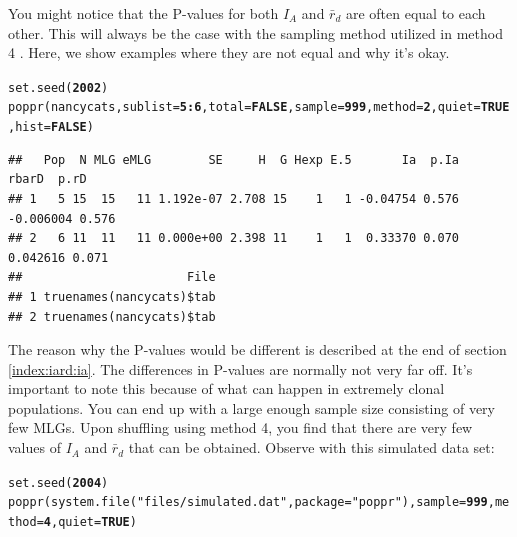 \documentclass[letterpaper]{article}\usepackage[]{graphicx}\usepackage[]{color}
\makeatletter
\newcommand{\hlnum}[1]{\textcolor[rgb]{0.502,0,0.502}{\textbf{#1}}}%
\newcommand{\hlstr}[1]{\textcolor[rgb]{0.651,0.522,0}{#1}}%
\newcommand{\hlopt}[1]{\textcolor[rgb]{1,0,0.502}{\textbf{#1}}}%
\newcommand{\hlstd}[1]{\textcolor[rgb]{0,0,0}{#1}}%
\newcommand{\hlkwc}[1]{\textcolor[rgb]{0,0.502,0.753}{#1}}%
\newcommand{\hlkwd}[1]{\textcolor[rgb]{0,0.267,0.4}{#1}}%
\newenvironment{kframe}{%
 \def\at@end@of@kframe{}%
 \ifinner\ifhmode%
  \def\at@end@of@kframe{\end{minipage}}%
  \begin{minipage}{\columnwidth}%
 \fi\fi%
 \def\FrameCommand##1{\hskip\@totalleftmargin \hskip-\fboxsep
 \colorbox{shadecolor}{##1}\hskip-\fboxsep
     \hskip-\linewidth \hskip-\@totalleftmargin \hskip\columnwidth}%
 \MakeFramed {\advance\hsize-\width
   \@totalleftmargin\z@ \linewidth\hsize
   \@setminipage}}%
 {\par\unskip\endMakeFramed%
 \at@end@of@kframe}
\newenvironment{knitrout}{}{} %
\makeatother
\begin{document}
You might notice that the P-values for both $I_A$ and $\bar r_d$ are often equal to each other. This will always be the case with the sampling method utilized in method 4 \cite{Agapow:2001}. Here, we show examples where they are not equal and why it's okay.
\begin{knitrout}\footnotesize
{}\color{fgcolor}\begin{kframe}
\begin{alltt}
\hlkwd{set.seed}\hlstd{(}\hlnum{2002}\hlstd{)}
\hlkwd{poppr}\hlstd{(nancycats,} \hlkwc{sublist} \hlstd{=} \hlnum{5}\hlopt{:}\hlnum{6}\hlstd{,} \hlkwc{total} \hlstd{=} \hlnum{FALSE}\hlstd{,} \hlkwc{sample} \hlstd{=} \hlnum{999}\hlstd{,} \hlkwc{method} \hlstd{=} \hlnum{2}\hlstd{,} \hlkwc{quiet} \hlstd{=} \hlnum{TRUE}\hlstd{,} \hlkwc{hist} \hlstd{=} \hlnum{FALSE}\hlstd{)}
\end{alltt}
\end{kframe}
\end{knitrout}

\begin{knitrout}\footnotesize
{}\color{fgcolor}\begin{kframe}
\begin{verbatim}
##   Pop  N MLG eMLG        SE     H  G Hexp E.5       Ia  p.Ia     rbarD  p.rD
## 1   5 15  15   11 1.192e-07 2.708 15    1   1 -0.04754 0.576 -0.006004 0.576
## 2   6 11  11   11 0.000e+00 2.398 11    1   1  0.33370 0.070  0.042616 0.071
##                       File
## 1 truenames(nancycats)$tab
## 2 truenames(nancycats)$tab
\end{verbatim}
\end{kframe}
\end{knitrout}

The reason why the P-values would be different is described at the end of section \ref{index:iard:ia}. The differences in P-values are normally not very far off. It's important to note this because of what can happen in extremely clonal populations. You can end up with a large enough sample size consisting of very few MLGs. Upon shuffling using method 4, you find that there are very few values of $I_A$ and $\bar r_d$ that can be obtained. Observe with this simulated data set:
\begin{knitrout}\footnotesize
{}\color{fgcolor}\begin{kframe}
\begin{alltt}
\hlkwd{set.seed}\hlstd{(}\hlnum{2004}\hlstd{)}
\hlkwd{poppr}\hlstd{(}\hlkwd{system.file}\hlstd{(}\hlstr{"files/simulated.dat"}\hlstd{,} \hlkwc{package} \hlstd{=} \hlstr{"poppr"}\hlstd{),} \hlkwc{sample} \hlstd{=} \hlnum{999}\hlstd{,} \hlkwc{method} \hlstd{=} \hlnum{4}\hlstd{,} \hlkwc{quiet} \hlstd{=} \hlnum{TRUE}\hlstd{)}
\end{alltt}
\end{kframe}
\end{knitrout}
\end{document}
